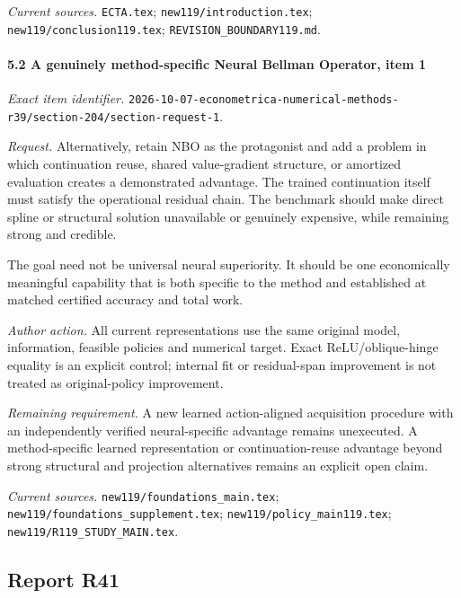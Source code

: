 \par\emph{Current sources.} \nolinkurl{ECTA.tex}; \nolinkurl{new119/introduction.tex}; \nolinkurl{new119/conclusion119.tex}; \nolinkurl{REVISION_BOUNDARY119.md}.

\paragraph{5.2 A genuinely method-specific Neural Bellman Operator, item 1}

\emph{Exact item identifier.} \nolinkurl{2026-10-07-econometrica-numerical-methods-r39/section-204/section-request-1}.

\par\emph{Request.} Alternatively, retain NBO as the protagonist and add a problem in which continuation reuse, shared value-gradient structure, or amortized evaluation creates a demonstrated advantage. The trained continuation itself must satisfy the operational residual chain. The benchmark should make direct spline or structural solution unavailable or genuinely expensive, while remaining strong and credible.

The goal need not be universal neural superiority. It should be one economically meaningful capability that is both specific to the method and established at matched certified accuracy and total work.

\par\emph{Author action.} All current representations use the same original model, information, feasible policies and numerical target. Exact ReLU/\allowbreak{}oblique-hinge equality is an explicit control; internal fit or residual-span improvement is not treated as original-policy improvement.

\par\emph{Remaining requirement.} A new learned action-aligned acquisition procedure with an independently verified neural-specific advantage remains unexecuted. A method-specific learned representation or continuation-reuse advantage beyond strong structural and projection alternatives remains an explicit open claim.

\par\emph{Current sources.} \nolinkurl{new119/foundations_main.tex}; \nolinkurl{new119/foundations_supplement.tex}; \nolinkurl{new119/policy_main119.tex}; \nolinkurl{new119/R119_STUDY_MAIN.tex}.

\subsection{Report R41}

